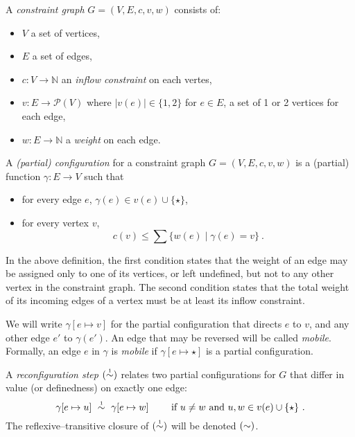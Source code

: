 \documentclass{lmcs}
\begin{document}
\begin{definition} 
A \emph{constraint graph} $G=(V,E,c,v,w)$ consists of:
\begin{itemize}
	\item $V$ a set of vertices,
	\item $E$ a set of edges,
	\item $c\colon V\to\mathbb N$ an \emph{inflow constraint} on each vertes,
	\item $v\colon E\to\mathcal P(V)$ where $|v(e)|\in\{1,2\}$ for $e\in E$, a set of 1 or 2 vertices for each edge,
 	\item $w\colon E\to\mathbb N$ a \emph{weight} on each edge.
\end{itemize}
\end{definition}

\begin{definition}
A \emph{(partial) configuration} for a constraint graph $G=(V,E,c,v,w)$ is a (partial) function $\gamma\colon E\to V$ such that
\begin{itemize}
	\item
for every edge $e$, $\gamma(e)\in v(e)\cup\{\star\}$,
	\item
for every vertex $v$,
\[
	c(v) \leq \sum\{w(e)\mid\gamma(e)=v\}~.
\]
\end{itemize} 
\end{definition}

In the above definition, the first condition states that the weight of an edge may be assigned only to one of its vertices, or left undefined, but not to any other vertex in the constraint graph. The second condition states that the total weight of its incoming edges of a vertex must be at least its inflow constraint.

We will write $\gamma[e\mapsto v]$ for the partial configuration that directs $e$ to $v$, and any other edge $e'$ to $\gamma(e')$. An edge that may be reversed will be called \emph{mobile}. Formally, an edge $e$ in $\gamma$ is \emph{mobile} if $\gamma[e\mapsto\star]$ is a partial configuration.

\begin{definition}
A \emph{reconfiguration step} $(\perm*)$ relates two partial configurations for $G$ that differ in value (or definedness) on exactly one edge:
\[
	\gamma[e\mapsto u]~\perm*~\gamma[e\mapsto w]\qquad\text{ if }u\neq w\text{ and }u,w\in v(e)\cup\{\star\}~.
\]
The reflexive--transitive closure of $(\perm*)$ will be denoted $(\perm)$.
\end{definition}
\end{document}
